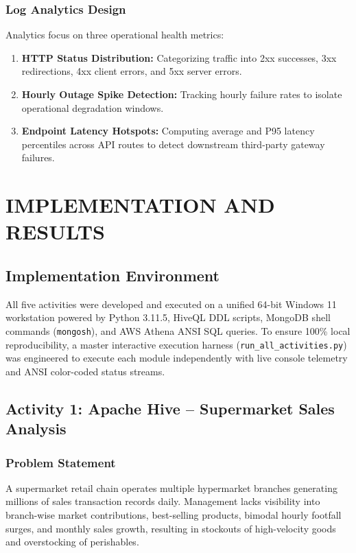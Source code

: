 \documentclass[12pt,a4paper]{report}
\newcommand{\activityheading}[2]{%
  \section{Activity #1: #2}%
}
\begin{document}
\subsection{Log Analytics Design}
Analytics focus on three operational health metrics:
\begin{enumerate}
    \item \textbf{HTTP Status Distribution:} Categorizing traffic into 2xx successes, 3xx redirections, 4xx client errors, and 5xx server errors.
    \item \textbf{Hourly Outage Spike Detection:} Tracking hourly failure rates to isolate operational degradation windows.
    \item \textbf{Endpoint Latency Hotspots:} Computing average and P95 latency percentiles across API routes to detect downstream third-party gateway failures.
\end{enumerate}

\chapter{IMPLEMENTATION AND RESULTS}

\section{Implementation Environment}
All five activities were developed and executed on a unified 64-bit Windows 11 workstation powered by Python 3.11.5, HiveQL DDL scripts, MongoDB shell commands (\texttt{mongosh}), and AWS Athena ANSI SQL queries. To ensure 100\% local reproducibility, a master interactive execution harness (\texttt{run\_all\_activities.py}) was engineered to execute each module independently with live console telemetry and ANSI color-coded status streams.

\activityheading{1}{Apache Hive -- Supermarket Sales Analysis}

\subsection{Problem Statement}
A supermarket retail chain operates multiple hypermarket branches generating millions of sales transaction records daily. Management lacks visibility into branch-wise market contributions, best-selling products, bimodal hourly footfall surges, and monthly sales growth, resulting in stockouts of high-velocity goods and overstocking of perishables.
\end{document}
